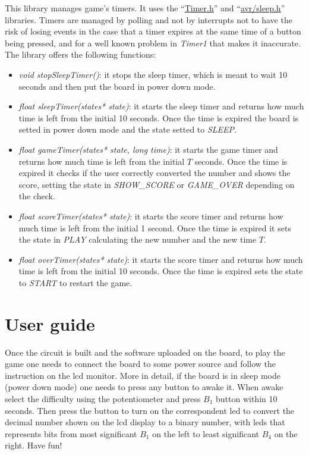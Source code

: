 \documentclass[a4paper,12pt]{report}
\begin{document}
    This library manages game's timers. It uses the ``\href{https://github.com/sstaub/Timer}{Timer.h}'' and ``\href{https://github.com/Patapom/Arduino/blob/master/Libraries/AVR%20Libc/avr-libc-2.0.0/include/avr/sleep.h}{avr/sleep.h}'' libraries.
    Timers are managed by polling and not by interrupts not to have the risk of losing events in the case that a timer expires at the same time of a button being pressed, and for a well known problem in \textit{Timer1} that makes it inaccurate. 
    \newline
    \newline
    The library offers the following functions:
    \begin{itemize}
        \item \textit{void stopSleepTimer()}: it stops the sleep timer, which is meant to wait 10 seconds and then put the board in power down mode. 
        \item \textit{float sleepTimer(states* state)}: it starts the sleep timer and returns how much time is left from the initial 10 seconds. Once the time is expired the board is setted in power down mode and the state setted to \textit{SLEEP}.  
        \item \textit{float gameTimer(states* state, long time)}: it starts the game timer and returns how much time is left from the initial $T$ seconds. Once the time is expired it checks if the user correctly converted the number and shows the score, setting the state in \textit{SHOW\_SCORE} or \textit{GAME\_OVER} depending on the check.
        \item \textit{float scoreTimer(states* state)}: it starts the score timer and returns how much time is left from the initial 1 second. Once the time is expired it sets the state in \textit{PLAY} calculating the new number and the new time $T$.
        \item \textit{float overTimer(states* state)}: it starts the score timer and returns how much time is left from the initial 10 seconds. Once the time is expired sets the state to \textit{START} to restart the game. 
    \end{itemize}
    
    
\appendix

\chapter{User guide}

    Once the circuit is built and the software uploaded on the board, to play the game one needs to connect the board to some power source and follow the instruction on the lcd monitor.
    More in detail, if the board is in sleep mode (power down mode) one needs to press any button to awake it. When awake select the difficulty using the potentiometer and press $B_1$ button within 10 seconds. Then press the button to turn on the correspondent led to convert the decimal number shown on the lcd display to a binary number, with leds that represents bits from most significant $B_1$ on the left to least significant $B_4$ on the right. Have fun!
    
\end{document}
